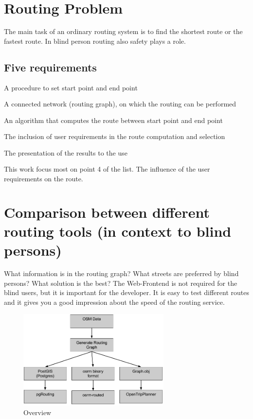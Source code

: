 \documentclass{sig-alternate}
\begin{document}
\section{Routing Problem}
The main task of an ordinary routing system is to find the shortest route or the fastest route. In blind person routing also safety plays a role.
\subsection{Five requirements\cite{weyrer}}
\begin{description}
  \item A procedure to set start point and end point
  \item A connected network (routing graph), on which the routing can be performed
  \item An algorithm that computes the route between start point and end point
  \item The inclusion of user requirements in the route computation and selection
  \item The presentation of the results to the use
\end{description}
This work focus most on point 4 of the list. The influence of the user requirements on the route.  

\section{Comparison between different routing tools (in context to blind persons)}

What information is in the routing graph? What streets are preferred by blind persons? What solution is the best?
The Web-Frontend is not required for the blind users, but it is important for the developer. It is easy to test different routes and it gives you a good impression about the speed of the routing service.

\begin{figure}
\centering
\includegraphics[width=3in]{Overview2.png}
\caption{Overview}
\end{figure}
\end{document}
